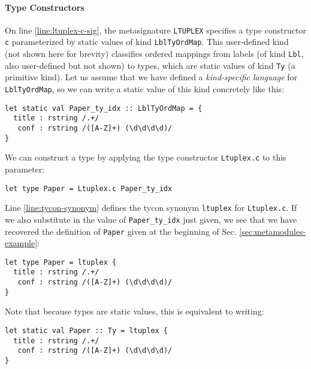 \paragraph{Type Constructors} On line \ref{line:ltuplex-c-sig}, the metasignature \lstinline{LTUPLEX} specifies a type constructor \lstinline{c} parameterized by static values of kind \lstinline{LblTyOrdMap}. This user-defined kind (not shown here for brevity) classifies ordered mappings from labels (of kind \lstinline{Lbl}, also user-defined but not shown) to types, which are static values of kind \lstinline{Ty} (a primitive kind). Let us assume that we have defined a \emph{kind-specific language} for \lstinline{LblTyOrdMap}, so we can write a static value of this kind concretely like this:
\begin{lstlisting}[numbers=none]
let static val Paper_ty_idx :: LblTyOrdMap = {
  title : rstring /.+/
   conf : rstring /([A-Z]+) (\d\d\d\d)/
}
\end{lstlisting}

We can construct a type by applying the type constructor \lstinline{Ltuplex.c} to this parameter:
\begin{lstlisting}[numbers=none]
let type Paper = Ltuplex.c Paper_ty_idx
\end{lstlisting}
Line \ref{line:tycon-synonym} defines the tycon synonym \lstinline{ltuplex} for \lstinline{Ltuplex.c}. If we also substitute in the value of \lstinline{Paper_ty_idx} just given, we see that we have recovered the definition of \lstinline{Paper} given at the beginning of Sec. \ref{sec:metamodules-example}:
\begin{lstlisting}[numbers=none]
let type Paper = ltuplex {
  title : rstring /.+/
   conf : rstring /([A-Z]+) (\d\d\d\d)/
}
\end{lstlisting}
Note that because types are static values, this is equivalent to writing:
\begin{lstlisting}[numbers=none]
let static val Paper :: Ty = ltuplex {
  title : rstring /.+/
   conf : rstring /([A-Z]+) (\d\d\d\d)/
}
\end{lstlisting}

